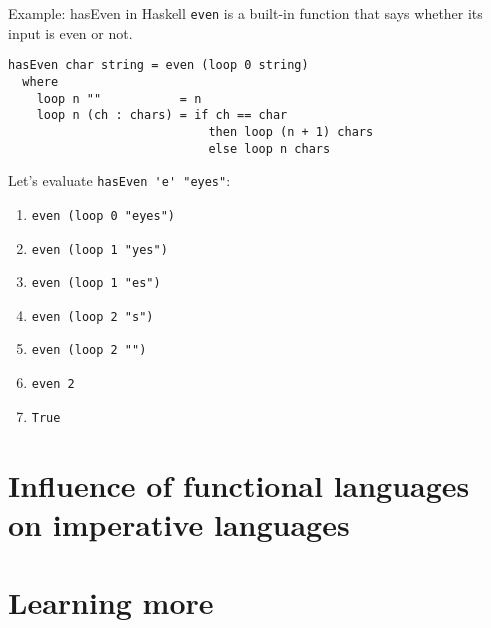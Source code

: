 \documentclass[pdf]{beamer}
\begin{document}
\begin{frame}[fragile]{Example: hasEven in Haskell}
\verb|even| is a built-in function that says whether its input is even or not.
\begin{verbatim}
hasEven char string = even (loop 0 string)
  where
    loop n ""           = n
    loop n (ch : chars) = if ch == char
                            then loop (n + 1) chars
                            else loop n chars
\end{verbatim}

  \pause
  Let's evaluate \verb|hasEven 'e' "eyes"|:

  \begin{enumerate}
    \item<1-> \verb|even (loop 0 "eyes")|
    \item<2-> \verb|even (loop 1 "yes")|
    \item<3-> \verb|even (loop 1 "es")|
    \item<4-> \verb|even (loop 2 "s")|
    \item<5-> \verb|even (loop 2 "")|
    \item<6-> \verb|even 2|
    \item<7-> \verb|True|
  \end{enumerate}

\end{frame}

\section{Influence of functional languages on imperative languages}
\label{sec:influence}

\section{Learning more}
\label{sec:learning-more}
\end{document}
